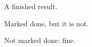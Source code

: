 \begin{theorem}\label{thm:done}
  \leanok
  A finished result.
\end{theorem}
\begin{lemma}\label{lem:open}
  \leanok
  Marked done, but it is not.
\end{lemma}
\begin{lemma}
  Not marked done: fine.
\end{lemma}
\begin{definition}
\end{definition}
